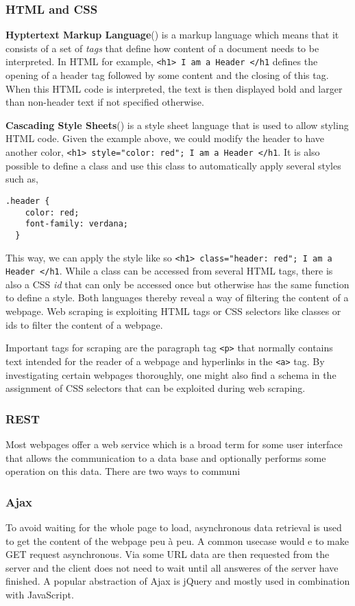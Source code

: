 \subsubsection{HTML and CSS}

\textbf{Hyptertext Markup Language}() is a markup language which means that it consists of a set of \textsl{tags} that define how content of a document needs to be interpreted. In HTML for example, \texttt{<h1> I am a Header </h1} defines the opening of a header tag followed by some content and the closing of this tag. When this HTML code is interpreted, the text is then displayed bold and larger than non-header text if not specified otherwise.

\textbf{Cascading Style Sheets}() is a style sheet language that is used to allow styling HTML code. Given the example above, we could modify the header to have another color, \texttt{<h1> style="color: red"; I am a Header </h1}. It is also possible to define a class and use this class to automatically apply several styles such as,
\begin{Verbatim}[samepage=true]
  .header {
    color: red;
    font-family: verdana;
  }
\end{Verbatim}
This way, we can apply the style like so \texttt{<h1> class="header: red"; I am a Header </h1}. While a class can be accessed from several HTML tags, there is also a CSS \textsl{id} that can only be accessed once but otherwise has the same function to define a style.
Both languages thereby reveal a way of filtering the content of a webpage. Web scraping is exploiting HTML tags or CSS selectors like classes or ids to filter the content of a webpage.

Important tags for scraping are the paragraph tag \texttt{<p>} that normally contains text intended for the reader of a webpage and hyperlinks in the \texttt{<a>} tag. By investigating certain webpages thoroughly, one might also find a schema in the assignment of CSS selectors that can be exploited during web scraping.

\subsubsection{REST}
Most webpages offer a web service which is a broad term for some user interface that allows the communication to a data base and optionally performs some operation on this data. There are two ways to communi
\subsubsection{Ajax}

To avoid waiting for the whole page to load, asynchronous data retrieval is used to get the content of the webpage peu \`{a} peu. A common usecase would e to make GET request asynchronous. Via some URL data are then requested from the server and the client does not need to wait until all answeres of the server have finished. A popular abstraction of Ajax is jQuery and mostly used in combination with JavaScript.
